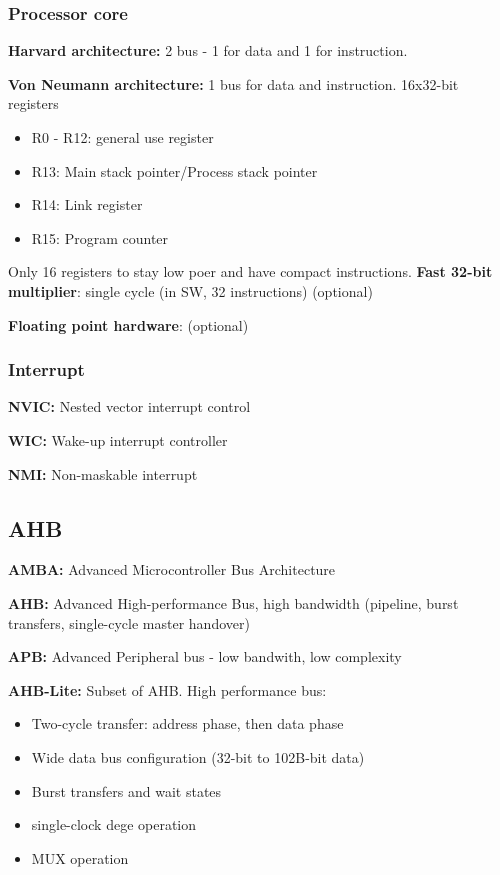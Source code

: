 \subsubsection{Processor core}
\textbf{Harvard architecture:} 2 bus - 1 for data and 1 for instruction.

\textbf{Von Neumann architecture:} 1 bus for data and instruction.
\bigbreak
16x32-bit registers
\begin{itemize}
  \item R0 - R12: general use register
  \item R13: Main stack pointer/Process stack pointer
  \item R14: Link register
  \item R15: Program counter
\end{itemize}

Only 16 registers to stay low poer and have compact instructions.
\bigbreak
\textbf{Fast 32-bit multiplier}: single cycle (in SW, 32 instructions) (optional)

\textbf{Floating point hardware}: (optional)


\subsubsection{Interrupt}
\textbf{NVIC:} Nested vector interrupt control

\textbf{WIC:} Wake-up interrupt controller

\textbf{NMI:} Non-maskable interrupt



\subsection{AHB}
\textbf{AMBA:} Advanced Microcontroller Bus Architecture

\textbf{AHB:} Advanced High-performance Bus, high bandwidth (pipeline, burst transfers, single-cycle master handover)

\textbf{APB:} Advanced Peripheral bus - low bandwith, low complexity

\textbf{AHB-Lite:} Subset of AHB. High performance bus:
\begin{itemize}
  \item Two-cycle transfer: address phase, then data phase
  \item Wide data bus configuration (32-bit to 102B-bit data)
  \item Burst transfers and wait states
  \item single-clock dege operation
  \item MUX operation
\end{itemize}



